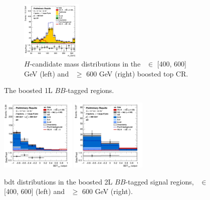 \begin{figure}[h!]
\begin{subfigure}[b]{\textwidth}
        \includegraphics[width=0.32\textwidth]{Images/VH/Own_fit/postfit_VHbb/Region_distmBB_BMin600_incFat1_Fat1_DSRtopaddbjetcr_J0_TTypebb_incJet1_T2_L1_Y6051_GlobalFit_conditionnal_mu1.png}
        \caption{$H$-candidate mass distributions in the \ptv\ $\in$ [400, 600] GeV (left) and \ptv\ $\geq$ 600 GeV (right) boosted top CR.}
        \label{fig:plots_VHbbBoost_1L_topCR}
    \end{subfigure}
    \caption{The boosted 1L $BB$-tagged regions.}
    \label{fig:plots_VHbbBoost_1L}
\end{figure} 


\begin{figure}[h!]
    \centering
    \includegraphics[width=0.32\textwidth]{Images/VH/Own_fit/postfit_VHbb/Region_distmva_BMax600_BMin400_incFat1_Fat1_DSR_J0_TTypebb_incJet1_T2_L2_Y6051_GlobalFit_conditionnal_mu1.png}
    \includegraphics[width=0.32\textwidth]{Images/VH/Own_fit/postfit_VHbb/Region_distmva_BMin600_incFat1_Fat1_DSR_J0_TTypebb_incJet1_T2_L2_Y6051_GlobalFit_conditionnal_mu1.png}
    \caption{\gls{bdt} distributions in the boosted 2L $BB$-tagged signal regions, \ptv\ $\in$ [400, 600] (left) and \ptv\ $\geq$ 600 GeV (right).}
    \label{fig:plots_VHbbBoost_2L_SR}
\end{figure} 
\vspace*{\fill}